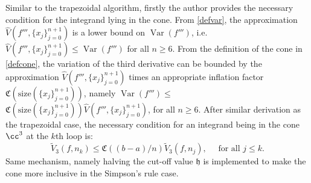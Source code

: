 \documentclass{iitthesis}
\DeclareMathOperator{\Var}{Var}
\theoremstyle{definition}
\theoremstyle{remark}
\begin{document}
Similar to the trapezoidal algorithm, firstly the author provides the necessary condition for the integrand lying in the cone. From \eqref{defvar}, the approximation $\widehat{V}({f'''},\{x_j\}_{j=0}^{n+1})$ is a lower bound on $\Var({f'''})$, i.e. $\widehat{V}({f'''},\{x_j\}_{j=0}^{n+1})\leq \Var({f'''})$ for all $n \ge 6$. From the definition of the cone in \eqref{defcone}, the variation of the third derivative can be bounded by the approximation $\widehat{V}({f'''},\{x_j\}_{j=0}^{n+1})$ times an appropriate inflation factor $\mathfrak{C}(\text{size}(\{x_j\}_{j=0}^{n+1}))$, namely $\Var({f'''})\leq$$\mathfrak{C}(\text{size}(\{x_j\}_{j=0}^{n+1}))\widehat{V}({f'''},\{x_j\}_{j=0}^{n+1})$, for all $n \ge 6$. After similar derivation as the trapezoidal case, the necessary condition for an integrand being in the cone $\cc^3$ at the $k$th loop is:
\begin{equation}\label{necconsim}
    \widetilde{V}_3(f,n_k)\leq\mathfrak{C}((b-a)/n)\widetilde{V}_3(f,n_j), \quad \text{ for all } j \leq k.
\end{equation}
Same mechanism, namely halving the cut-off value $\mathfrak{h}$ is implemented to make the cone more inclusive in the Simpson's rule case.
\end{document}
